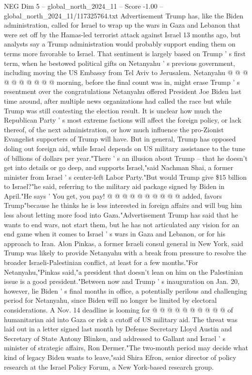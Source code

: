 \begin{textsample}{NEG Dim 5 – global\_north\_2024\_11 – Score -1.00 – global\_north\_2024\_11/117325764.txt}
Advertisement Trump has, like the Biden administration, called for Israel to wrap up the wars in Gaza and Lebanon that were set off by the Hamas-led terrorist attack against Israel 13 months ago, but analysts say a Trump administration would probably support ending them on terms more favorable to Israel.
That sentiment is largely based on Trump ' s first term, when he bestowed political gifts on Netanyahu ' s previous government, including moving the US Embassy from Tel Aviv to Jerusalem.
Netanyahu @ @ @ @ @ @ @ @ @ @ morning, before the final count was in, might erase Trump ' s resentment over the congratulations Netanyahu offered President Joe Biden last time around, after multiple news organizations had called the race but while Trump was still contesting the election result.
It is unclear how much the Republican Party ' s most extreme factions will affect the foreign policy, or lack thereof, of the next administration, or how much influence the pro-Zionist Evangelist supporters of Trump will have.
But in general, Trump has opposed doling out foreign aid, while Israel depends on US military assistance to the tune of billions of dollars per year."There ' s an illusion about Trump -- that he doesn't get into details or go deep, and supports Israel,"said Nachman Shai, a former minister from Israel ' s center-left Labor Party."But would Trump give \$15 billion to Israel?"he said, referring to the military aid package signed by Biden in April."He says ' You get, you pay! @ @ @ @ @ @ @ @ @ @ added, favors Trump"because he thinks he is less interested in foreign affairs and will bug him less about letting more food into Gaza."Advertisement Trump has said that he wants to end wars, not start them, but he has not articulated any vision for an end game when it comes to Israel ' s wars in Gaza and Lebanon, or for his approach to Iran.
Alon Pinkas, a former Israeli consul general in New York, said Trump was likely to provide Netanyahu with a break from pressure to resolve the broader Israeli-Palestinian conflict, at least for a few months."For Netanyahu,"Pinkas said,"a president that doesn't lean on him on the Palestinian issue is a good president."Between now and Trump ' s inauguration on Jan. 20, however, lie Biden ' s final months in office, a potentially perilous and challenging period for Netanyahu, since Biden will no longer be limited by electoral considerations.
A Nov. 14 deadline is looming for @ @ @ @ @ @ @ @ @ @ of humanitarian aid into Gaza or risk a cutoff of US military aid.
The threat was laid out in a letter signed last month by Defense Secretary Lloyd Austin and Secretary of State Antony Blinken, and addressed to Gallant and Israel ' s minister of strategic affairs, Ron Dermer."The two-month period may decide what kind of legacy Biden wants to leave,"said Shira Efron, senior director of policy research at the Israel Policy Forum, a New York-based research group.

\end{textsample}
